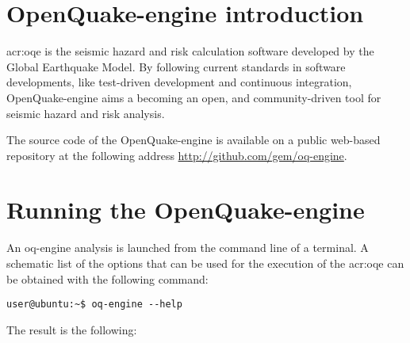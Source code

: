 \section{OpenQuake-engine introduction}
\gls{acr:oqe} is the seismic hazard and risk calculation software developed 
by the Global Earthquake Model. By following current standards in software 
developments, like test-driven development and continuous
integration, OpenQuake-engine aims a becoming an open, and community-driven tool for
seismic hazard and risk analysis.

The source code of the OpenQuake-engine is available on a public web-based
repository at the following address
\href{http://github.com/gem/oq-engine}{http://github.com/gem/oq-engine}.
\section{Running the OpenQuake-engine}
\label{sec:intro}
An oq-engine analysis is launched from the command line of a terminal. 
%
A schematic list of the options that can be used for the execution of the 
\gls{acr:oqe} can be obtained with the following command:
\begin{Verbatim}[frame=single, commandchars=\\\{\}, fontsize=\small]
user@ubuntu:~$ oq-engine --help
\end{Verbatim}
The result is the following:
